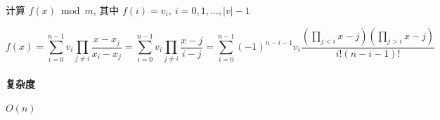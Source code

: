 计算 \(f(x) \bmod m\), 其中 \(f(i) = v_i,~i = 0,1,\dots,|v|-1\)

\[
    f(x) =\sum_{i=0}^{n-1} v_i \prod_{j\ne i} \frac{x-x_j}{x_i-x_j}   =\sum_{i=0}^{n-1} v_i \prod_{j\ne i} \frac{x-j}{i-j} =\sum_{i=0}^{n-1} (-1)^{n-i-1} v_i \frac{(\prod_{j<i} x-j)(\prod_{j>i} x-j)}{i!(n-i-1)!}
\]

\paragraph{复杂度}

\(O(n)\)